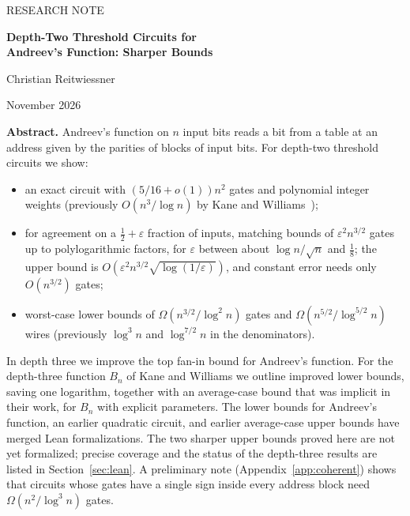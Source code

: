 \documentclass[11pt,letterpaper]{article}
\theoremstyle{remark}
\begin{document}
\thispagestyle{empty}
{\color{accent}\small RESEARCH NOTE\par}
\vspace{0.4em}
{\raggedright\color{ink}\LARGE\bfseries Depth-Two Threshold Circuits for\\[0.15em]
Andreev's Function: Sharper Bounds\par}
\vspace{0.5em}
{\large Christian Reitwiessner\par}
{\small November 2026\par}
\vspace{0.8em}

\begin{keybox}
\textbf{Abstract.} Andreev's function on $n$ input bits reads a bit from a
table at an address given by the parities of blocks of input bits. For
depth-two threshold circuits we show:
\begin{itemize}
\item an exact circuit with $(5/16+o(1))n^2$ gates and polynomial integer
      weights (previously $O(n^3/\log n)$ by Kane and Williams~\cite{KW});
\item for agreement on a $\tfrac12+\varepsilon$ fraction of inputs, matching
      bounds of $\varepsilon^2n^{3/2}$ gates up to polylogarithmic factors,
      for $\varepsilon$ between about $\log n/\sqrt n$ and $\tfrac18$;
      the upper bound is $O(\varepsilon^2n^{3/2}\sqrt{\log(1/\varepsilon)})$,
      and constant error needs only $O(n^{3/2})$ gates;
\item worst-case lower bounds of $\Omega(n^{3/2}/\log^2 n)$ gates and
      $\Omega(n^{5/2}/\log^{5/2}n)$ wires (previously $\log^3 n$ and
      $\log^{7/2}n$ in the denominators).
\end{itemize}
In depth three we improve the top fan-in bound for Andreev's function. For
the depth-three function $B_n$ of Kane and Williams we outline improved
lower bounds, saving one logarithm, together with an average-case bound that
was implicit in their work, for $B_n$ with explicit parameters. The lower
bounds for Andreev's function, an earlier quadratic circuit, and earlier
average-case upper bounds have merged Lean formalizations. The two sharper
upper bounds proved here are not yet formalized; precise coverage and the
status of the depth-three results are listed in Section~\ref{sec:lean}. A preliminary note (Appendix~\ref{app:coherent})
shows that circuits whose gates have a single sign inside every address block
need $\Omega(n^2/\log^3n)$ gates.
\end{keybox}
\end{document}
